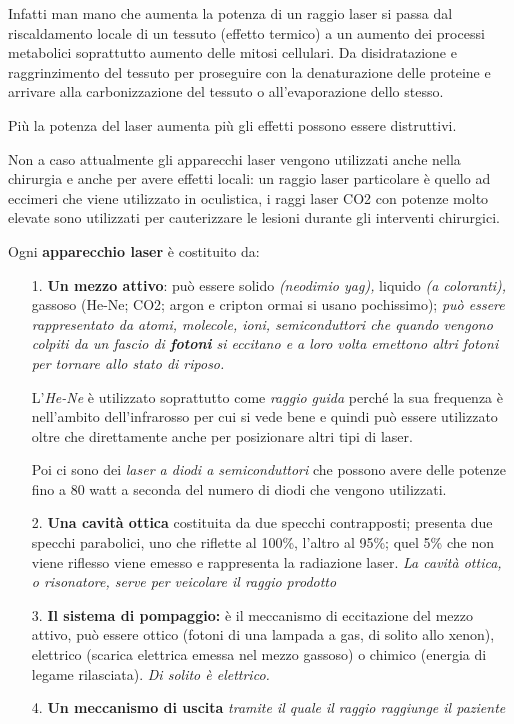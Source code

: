 Infatti man mano che aumenta la potenza di un raggio laser si passa dal
riscaldamento locale di un tessuto (effetto termico) a un aumento dei
processi metabolici soprattutto aumento delle mitosi cellulari. Da
disidratazione e raggrinzimento del tessuto per proseguire con la
denaturazione delle proteine e arrivare alla carbonizzazione del tessuto
o all'evaporazione dello stesso.

Più la potenza del laser aumenta più gli effetti possono essere
distruttivi.

Non a caso attualmente gli apparecchi laser vengono utilizzati anche
nella chirurgia e anche per avere effetti locali: un raggio laser
particolare è quello ad eccimeri che viene utilizzato in oculistica, i
raggi laser CO2 con potenze molto elevate sono utilizzati per
cauterizzare le lesioni durante gli interventi chirurgici.

Ogni \textbf{apparecchio laser} è costituito da:

\begin{itemize}
\item[1.]
  \textbf{Un mezzo attivo}: può essere solido \emph{(neodimio yag),}
  liquido \emph{(a coloranti),} gassoso (He-Ne; CO2; argon e cripton
  ormai si usano pochissimo); \emph{può essere rappresentato da atomi,
  molecole, ioni, semiconduttori che quando vengono colpiti da un fascio
  di \textbf{fotoni} si eccitano e a loro volta emettono altri fotoni
  per tornare allo stato di riposo.}

L'\emph{He-Ne} è utilizzato soprattutto come \emph{raggio guida} perché
la sua frequenza è nell'ambito dell'infrarosso per cui si vede bene e
quindi può essere utilizzato oltre che direttamente anche per
posizionare altri tipi di laser.

Poi ci sono dei \emph{laser a diodi a semiconduttori} che possono avere
delle potenze fino a 80 watt a seconda del numero di diodi che vengono
utilizzati.

\item[2.]
  \textbf{Una cavità ottica} costituita da due specchi contrapposti;
  presenta due specchi parabolici, uno che riflette al 100\%, l'altro al
  95\%; quel 5\% che non viene riflesso viene emesso e rappresenta la
  radiazione laser. \emph{La cavità ottica, o risonatore, serve per
  veicolare il raggio prodotto}
\item[3.]
  \textbf{Il sistema di pompaggio:} è il meccanismo di eccitazione del
  mezzo attivo, può essere ottico (fotoni di una lampada a gas, di
  solito allo xenon), elettrico (scarica elettrica emessa nel mezzo
  gassoso) o chimico (energia di legame rilasciata). \emph{Di solito è
  elettrico.}
\item[4.]
  \textbf{Un meccanismo di uscita} \emph{tramite il quale il raggio
  raggiunge il paziente }
\end{itemize}


